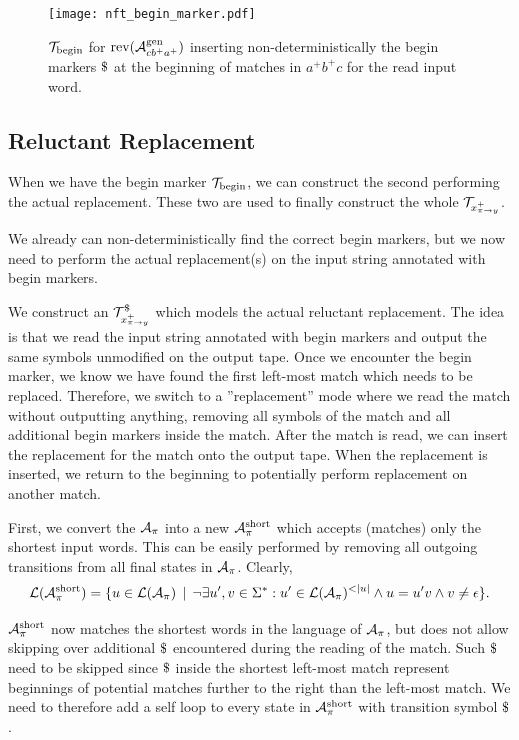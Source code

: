 \begin{figure}[ht]%
  \centering
  \texttt{[image: nft\_begin\_marker.pdf]}
  \caption{\nft $\mathcal{T}_{\text{begin}}$ for $\text{rev(}\mathcal{A}^{\text{gen}}_{cb^+a^+}\text{)}$ inserting non-deterministically the begin markers $\marker$ at the beginning of matches in $a^+b^+c$ for the read input word.}
  \label{fig:begin_marker_nft}
\end{figure}

\subsection{Reluctant Replacement \nft}
\label{sec:reluctant_replacement_nft}

When we have the begin marker \nft $\mathcal{T}_{\text{begin}}$, we can construct the second \nft performing the actual replacement.
These two \nfts are used to finally construct the whole $\mathcal{T}_{x^{+}_{\pi \rightarrow y}}$.

We already can non-deterministically find the correct begin markers, but we now need to perform the actual replacement(s) on the input string annotated with begin markers.

We construct an \nft $\mathcal{T}^\$_{x^{+}_{\pi \rightarrow y}}$ which models the actual reluctant replacement.
The idea is that we read the input string annotated with begin markers and output the same symbols unmodified on the output tape.
Once we encounter the begin marker, we know we have found the first left-most match which needs to be replaced.
Therefore, we switch to a ''replacement'' mode where we read the match without outputting anything, removing all symbols of the match and all additional begin markers inside the match.
After the match is read, we can insert the replacement for the match onto the output tape.
When the replacement is inserted, we return to the beginning to potentially perform replacement on another match.

First, we convert the $\mathcal{A}_{\pi}$ into a new \nfa $\mathcal{A}^{\text{short}}_{\pi}$ which accepts (matches) only the shortest input words.
This can be easily performed by removing all outgoing transitions from all final states in $\mathcal{A}_{\pi}$.
Clearly,
$$\langof{\aut^{\text{short}}_{\pi}} = \{ u \in \langof{\aut_{\pi}} \,\mid\, \neg \exists u', v \in \Sigma^*: u' \in \langof{\aut_{\pi}}^{<|u|} \land u = u'v \land v \neq \epsilon \}\text{.}$$

$\mathcal{A}^{\text{short}}_{\pi}$ now matches the shortest words in the language of $\mathcal{A}_{\pi}$, but does not allow skipping over additional $\marker$ encountered during the reading of the match.
Such $\marker$ need to be skipped since $\marker$ inside the shortest left-most match represent beginnings of potential matches further to the right than the left-most match.
We need to therefore add a self loop to every state in $\mathcal{A}^{\text{short}}_{\pi}$ with transition symbol $\marker$.

